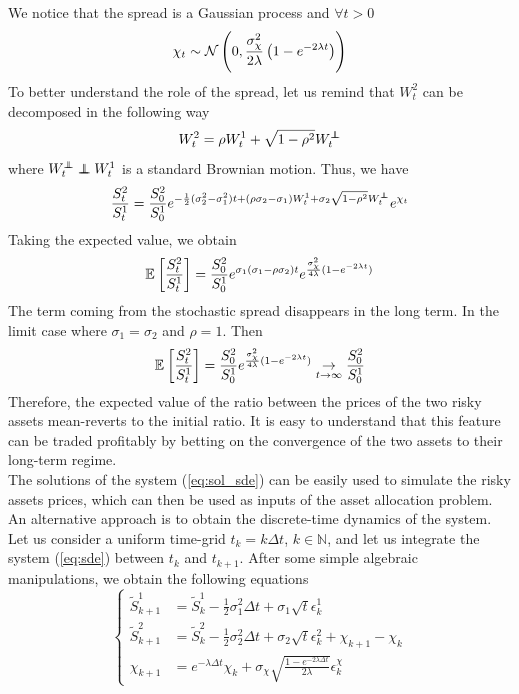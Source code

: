 We notice that the spread is a Gaussian process and $\forall t > 0$
\begin{equation} 
	\chi_t \sim \mathcal{N}\left(0, \frac{\sigma_\chi^2}{2\lambda}\left(1-e^{-2\lambda t}\right) \right)
\end{equation}
To better understand the role of the spread, let us remind that $W_t^2$ can be decomposed in the following way 
\begin{equation}
	W_t^2 = \rho W_t^1 + \sqrt{1-\rho^2} W_t^{\independent}
\end{equation}
where $W_t^{\independent} \independent W_t^1$ is a standard Brownian motion. Thus, we have 
\begin{equation}
	\frac{S_t^2}{S_t^1} = \frac{S_0^2}{S_0^1} e^{-\frac{1}{2}(\sigma_2^2 - \sigma_1^2) t + (\rho \sigma_2 - \sigma_1) W_t^1 + \sigma_2 \sqrt{1-\rho^2} W_t^{\independent}} e^{\chi_t} 
\end{equation} 
Taking the expected value, we obtain 
\begin{equation}
	\mathbb{E}_{}\left[ \frac{S_t^2}{S_t^1} \right] = \frac{S_0^2}{S_0^1} e^{\sigma_1 (\sigma_1 - \rho \sigma_2) t} e^{\frac{\sigma_\chi^2}{4\lambda} (1-e^{-2\lambda t})} 
\end{equation} 
The term coming from the stochastic spread disappears in the long term. In the limit case where $\sigma_1 = \sigma_2$ and $\rho = 1$. Then 
\begin{equation}
	\mathbb{E}_{}\left[ \frac{S_t^2}{S_t^1} \right] = \frac{S_0^2}{S_0^1} e^{\frac{\sigma_\chi^2}{4\lambda} (1-e^{-2\lambda t})} \underset{t \to \infty}{\to} \frac{S_0^2}{S_0^1}
\end{equation} 
Therefore, the expected value of the ratio between the prices of the two risky assets mean-reverts to the initial ratio. It is easy to understand that this feature can be traded profitably by betting on the convergence of the two assets to their long-term regime.\\
The solutions of the system (\ref{eq:sol_sde}) can be easily used to simulate the risky assets prices, which can then be used as inputs of the asset allocation problem. An alternative approach is to obtain the discrete-time dynamics of the system. Let us consider a uniform time-grid $t_k = k \Delta t$, $k \in \mathbb{N}$, and let us integrate the system (\ref{eq:sde}) between $t_k$ and $t_{k+1}$. After some simple algebraic manipulations, we obtain the following equations 
\begin{equation}
	\label{eq:dt_dynamics}
	\begin{cases}
		\widetilde{S}_{k+1}^1 &= \widetilde{S}_{k}^1 -\frac{1}{2} \sigma_1^2 \Delta t + \sigma_1 \sqrt{t} \epsilon_k^1\\ 
		\widetilde{S}_{k+1}^2 &= \widetilde{S}_{k}^2 -\frac{1}{2} \sigma_2^2 \Delta t + \sigma_2 \sqrt{t} \epsilon_k^2 + \chi_{k+1} - \chi_k\\
		\chi_{k+1} &= e^{-\lambda \Delta t} \chi_k + \sigma_\chi \sqrt{\frac{1-e^{-2\lambda \Delta t}}{2\lambda}} \epsilon_k^\chi
	\end{cases}
\end{equation}
